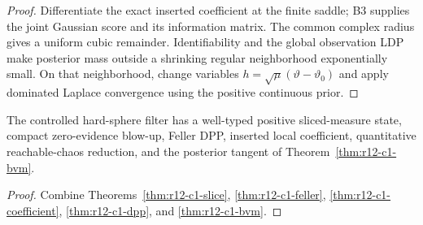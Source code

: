 \begin{proof}
Differentiate the exact inserted coefficient at the finite saddle; B3 supplies
the joint Gaussian score and its information matrix.  The common complex
radius gives a uniform cubic remainder.  Identifiability and the global
observation LDP make posterior mass outside a shrinking regular neighborhood
exponentially small.  On that neighborhood, change variables
$h=\sqrt\mu(\vartheta-\vartheta_0)$ and apply dominated Laplace convergence
using the positive continuous prior.
\end{proof}

\begin{theorem}
\label{thm:r12-c1-main}
The controlled hard-sphere filter has a well-typed positive sliced-measure
state, compact zero-evidence blow-up, Feller DPP, inserted local coefficient,
quantitative reachable-chaos reduction, and the posterior tangent of
Theorem~\ref{thm:r12-c1-bvm}.
\end{theorem}

\begin{proof}
Combine Theorems~\ref{thm:r12-c1-slice},
\ref{thm:r12-c1-feller}, \ref{thm:r12-c1-coefficient},
\ref{thm:r12-c1-dpp}, and \ref{thm:r12-c1-bvm}.
\end{proof}
